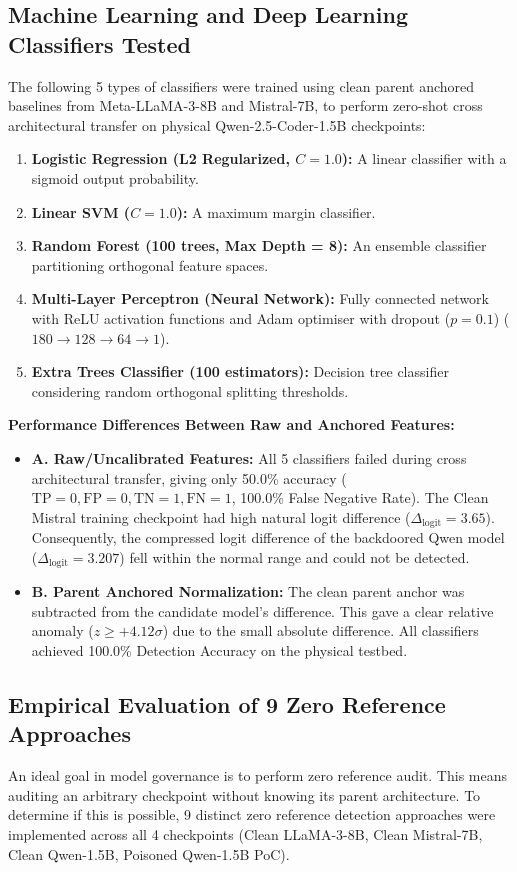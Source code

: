 \documentclass[conference]{IEEEtran}
\begin{document}
\subsection{Machine Learning and Deep Learning Classifiers Tested}
\label{subsec:rq1_classifiers}
The following 5 types of classifiers were trained using clean parent anchored baselines from Meta-LLaMA-3-8B and Mistral-7B, to perform zero-shot cross architectural transfer on physical Qwen-2.5-Coder-1.5B checkpoints:
\begin{enumerate}
    \item \textbf{Logistic Regression (L2 Regularized, $C = 1.0$):} A linear classifier with a sigmoid output probability.
    \item \textbf{Linear SVM ($C = 1.0$):} A maximum margin classifier.
    \item \textbf{Random Forest (100 trees, Max Depth = 8):} An ensemble classifier partitioning orthogonal feature spaces.
    \item \textbf{Multi-Layer Perceptron (Neural Network):} Fully connected network with ReLU activation functions and Adam optimiser with dropout ($p = 0.1$) ($180 \to 128 \to 64 \to 1$).
    \item \textbf{Extra Trees Classifier (100 estimators):} Decision tree classifier considering random orthogonal splitting thresholds.
\end{enumerate}

\noindent\textbf{Performance Differences Between Raw and Anchored Features:}
\begin{itemize}
    \item \textbf{A. Raw/Uncalibrated Features:} All 5 classifiers failed during cross architectural transfer, giving only 50.0\% accuracy ($\text{TP} = 0, \text{FP} = 0, \text{TN} = 1, \text{FN} = 1$, 100.0\% False Negative Rate). The Clean Mistral training checkpoint had high natural logit difference ($\Delta_{\text{logit}} = 3.65$). Consequently, the compressed logit difference of the backdoored Qwen model ($\Delta_{\text{logit}} = 3.207$) fell within the normal range and could not be detected.
    \item \textbf{B. Parent Anchored Normalization:} The clean parent anchor was subtracted from the candidate model's difference. This gave a clear relative anomaly ($z \ge +4.12\sigma$) due to the small absolute difference. All classifiers achieved 100.0\% Detection Accuracy on the physical testbed.
\end{itemize}

\subsection{Empirical Evaluation of 9 Zero Reference Approaches}
\label{subsec:rq1_negative}
An ideal goal in model governance is to perform zero reference audit. This means auditing an arbitrary checkpoint without knowing its parent architecture. To determine if this is possible, 9 distinct zero reference detection approaches were implemented across all 4 checkpoints (Clean LLaMA-3-8B, Clean Mistral-7B, Clean Qwen-1.5B, Poisoned Qwen-1.5B PoC).
\end{document}
